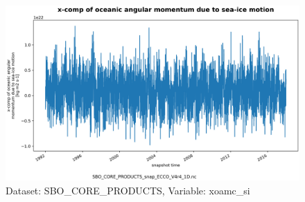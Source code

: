 \begin{figure}[H]
\centering
\includegraphics[scale=0.55]{../images/plots/oneD_plots/SBO_Core_Products/xoamc_si.png}
\caption{Dataset: SBO\_CORE\_PRODUCTS, Variable: xoamc\_si}
\label{tab:table-SBO_CORE_PRODUCTS_xoamc_si-Plot}
\end{figure}
\newpage
\pagebreak
